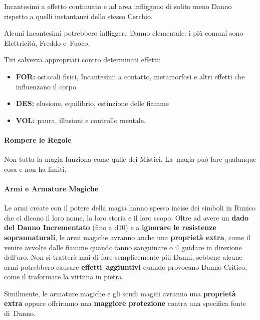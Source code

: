\documentclass[itdr]{subfiles}
\begin{document}
Incantesimi a effetto continuato e ad area infliggono di solito meno Danno rispetto a quelli instantanei dello stesso Cerchio.

Alcuni Incantesimi potrebbero infliggere Danno \mbox{elementale:} i più comuni sono Elettricità, Freddo e~Fuoco.

Tiri salvezza appropriati contro determinati effetti:
\begin{itemize}
	\item \textbf{FOR:} ostacali fisici, Incantesimi a contatto, metamorfosi e altri effetti che influenzano il corpo
	\item \textbf{DES:} elusione, equilibrio, estinzione delle fiamme
	\item \textbf{VOL:} paura, illusioni e controllo mentale.
\end{itemize}

\vfill

\paragraph{Rompere le Regole}
Non tutta la magia funziona come qulle dei Mistici. La~magia può fare qualunque cosa e non ha limiti.

\vspace{10ex}
\break

\paragraph{Armi e Armature Magiche}
Le armi create con il potere della magia hanno spesso incise dei simboli in Runico che ci dicono il loro nome, la loro storia e il loro scopo. Oltre ad avere un \textbf{dado del Danno Incrementato} (fino a d10) e a \textbf{ignorare le resistenze soprannaturali}, le armi magiche avranno anche una \textbf{proprietà extra}, come il venire avvolte dalle fiamme quando fanno sanguinare o il guidare in direzione dell'oro. Non si tratterà mai di \mbox{fare} semplicemente più Danni, sebbene alcune armi potrebbero causare \mbox{\textbf{effetti aggiuntivi}} quando provocano Danno Critico, come il traformare la vittima in pietra.

Similmente, le armature magiche e gli scudi magici avranno una \textbf{proprietà extra} oppure offriranno una \textbf{maggiore protezione} contra una specifica fonte di~Danno.
\end{document}

